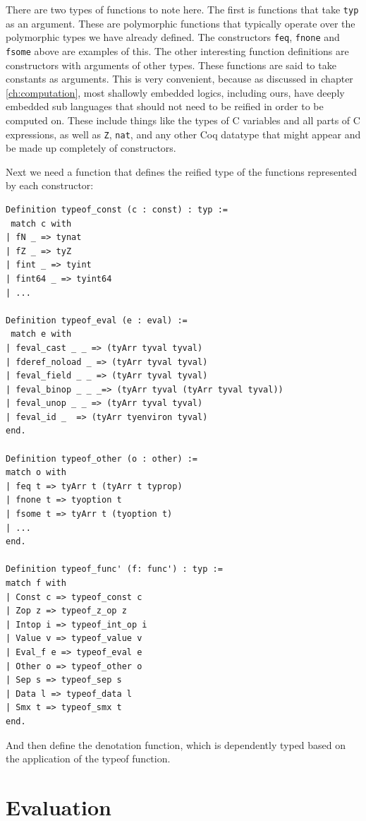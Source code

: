 \documentclass{puthesis}
\begin{document}
There are two types of functions to note here. The first is functions
that take \lstinline|typ| as an argument. These are polymorphic
functions that typically operate over the polymorphic types we have
already defined. The constructors \lstinline|feq|, \lstinline|fnone|
and \lstinline|fsome| above are examples of this. The other
interesting function definitions are constructors with arguments of
other types. These functions are said to take constants as
arguments. This is very convenient, because as discussed in chapter
\ref{ch:computation}, most shallowly embedded logics, including ours,
have deeply embedded sub languages that should not need to be reified
in order to be computed on. These include things like the types of C
variables and all parts of C expressions, as well as \lstinline|Z|,
\lstinline|nat|, and any other Coq datatype that might appear and be
made up completely of constructors.

Next we need a function that defines the reified type of the functions
represented by each constructor:

\begin{lstlisting}
Definition typeof_const (c : const) : typ :=
 match c with
| fN _ => tynat
| fZ _ => tyZ
| fint _ => tyint
| fint64 _ => tyint64
| ...

Definition typeof_eval (e : eval) :=
 match e with
| feval_cast _ _ => (tyArr tyval tyval)
| fderef_noload _ => (tyArr tyval tyval)
| feval_field _ _ => (tyArr tyval tyval)
| feval_binop _ _ _=> (tyArr tyval (tyArr tyval tyval))
| feval_unop _ _ => (tyArr tyval tyval)
| feval_id _  => (tyArr tyenviron tyval)
end.

Definition typeof_other (o : other) :=
match o with
| feq t => tyArr t (tyArr t typrop) 
| fnone t => tyoption t
| fsome t => tyArr t (tyoption t)
| ...
end.

Definition typeof_func' (f: func') : typ :=
match f with
| Const c => typeof_const c
| Zop z => typeof_z_op z
| Intop i => typeof_int_op i
| Value v => typeof_value v
| Eval_f e => typeof_eval e
| Other o => typeof_other o
| Sep s => typeof_sep s
| Data l => typeof_data l
| Smx t => typeof_smx t
end.
\end{lstlisting}

And then define the denotation function, which is dependently typed
based on the application of the typeof function.



\chapter{Evaluation}
\end{document}
